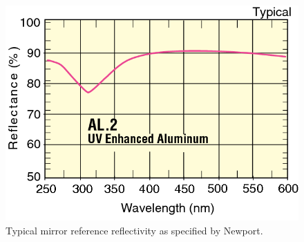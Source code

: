 \begin{figure}[ht]
    \centering
    \includegraphics[width=1.0\linewidth]{images/Ref_Mirror}
    \caption{Typical mirror reference reflectivity  as specified by Newport.}
    \label{fig:Ref_Mirror}
\end{figure}
 

